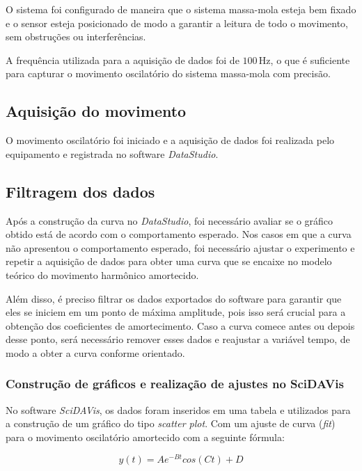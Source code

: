 \documentclass[12pt,a4paper]{article}
\begin{document}
O sistema foi configurado de maneira que o sistema massa-mola esteja bem fixado e o sensor esteja posicionado de modo a garantir a leitura de todo o movimento, sem obstruções ou interferências.

A frequência utilizada para a aquisição de dados foi de \(100\,\text{Hz}\), o que é suficiente para capturar o movimento oscilatório do sistema massa-mola com precisão.

\subsection{Aquisição do movimento}

O movimento oscilatório foi iniciado e a aquisição de dados foi realizada pelo equipamento e registrada no software \textit{DataStudio}.

\subsection{Filtragem dos dados}

Após a construção da curva no \textit{DataStudio}, foi necessário avaliar se o gráfico obtido está de acordo com o comportamento esperado. Nos casos em que a curva não apresentou o comportamento esperado, foi necessário ajustar o experimento e repetir a aquisição de dados para obter uma curva que se encaixe no modelo teórico do movimento harmônico amortecido.

Além disso, é preciso filtrar os dados exportados do software para garantir que eles se iniciem em um ponto de máxima amplitude, pois isso será crucial para a obtenção dos coeficientes de amortecimento. Caso a curva comece antes ou depois desse ponto, será necessário remover esses dados e reajustar a variável tempo, de modo a obter a curva conforme orientado.

\subsubsection{Construção de gráficos e realização de ajustes no SciDAVis}

No software \textit{SciDAVis}, os dados foram inseridos em uma tabela e utilizados para a construção de um gráfico do tipo \textit{scatter plot}. Com um ajuste de curva (\textit{fit}) para o movimento oscilatório amortecido com a seguinte fórmula:

\begin{equation}
    y(t) = Ae^{-Bt}cos(Ct) + D
\end{equation}
\end{document}
